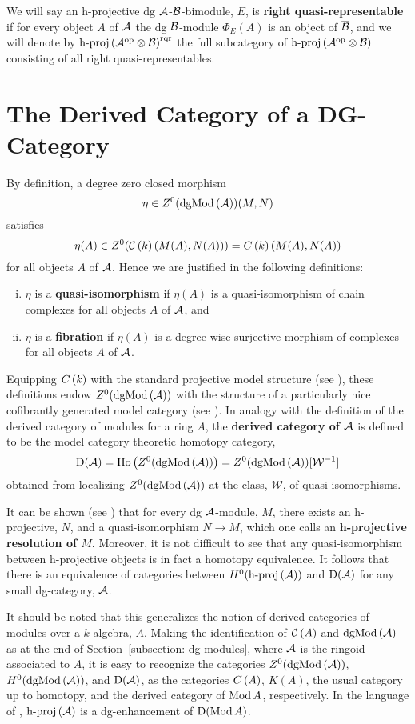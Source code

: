 We will say an h-projective dg \(\mathcal{A}\)-\(\mathcal{B}\)-bimodule, \(E\), is \textbf{right quasi-representable} if for every object \(A\) of \(\mathcal{A}\) the dg \(\mathcal{B}\)-module \(\Phi_E(A)\) is an object of \(\overline{\mathcal{B}}\), and we will denote by \(\operatorname{h-proj}\left(\mathcal{A}^{\operatorname{op}} \otimes \mathcal{B}\right)^{\operatorname{rqr}}\) the full subcategory of \(\operatorname{h-proj}\left(\mathcal{A}^{\operatorname{op}} \otimes \mathcal{B}\right)\) consisting of all right quasi-representables.

\section{The Derived Category of a DG-Category}
By definition, a degree zero closed morphism
\[\eta \in Z^0(\operatorname{dgMod}\left(\mathcal{A}\right))(M,N)\]
satisfies
\[\eta(A) \in Z^0(\mathcal{C}\left(k\right)(M(A), N(A))) = C\left(k\right)(M(A), N(A))\]
for all objects \(A\) of \(\mathcal{A}\).
Hence we are justified in the following definitions:
\begin{enumerate}[(i)]
\item
  \(\eta\) is a \textbf{quasi-isomorphism} if \(\eta(A)\) is a quasi-isomorphism of chain complexes for all objects \(A\) of \(\mathcal{A}\), and
\item
  \(\eta\) is a \textbf{fibration} if \(\eta(A)\) is a degree-wise surjective morphism of complexes for all objects \(A\) of \(\mathcal{A}\).
\end{enumerate}
Equipping \(C\left(k\right)\) with the standard projective model structure (see \parencite[Section 2.3]{Hovey99}), these definitions endow \(Z^0(\operatorname{dgMod}\left(\mathcal{A}\right))\) with the structure of a particularly nice cofibrantly generated model category (see \parencite[Section 3]{Toen07}).
In analogy with the definition of the derived category of modules for a ring \(A\), the \textbf{derived category of \(\mathcal{A}\)} is defined to be the model category theoretic homotopy category,
\[\mathrm{D}(\mathcal{A}) = \operatorname{Ho}\left(Z^0(\operatorname{dgMod}\left(\mathcal{A}\right))\right) = Z^0(\operatorname{dgMod}\left(\mathcal{A}\right))[\mathcal{W}^{-1}]\]
obtained from localizing \(Z^0(\operatorname{dgMod}\left(\mathcal{A}\right))\) at the class, \(\mathcal{W}\), of quasi-isomorphisms.

It can be shown (see \parencite[Section 3.5]{Keller95}) that for every dg \(\mathcal{A}\)-module, \(M\), there exists an h-projective, \(N\), and a quasi-isomorphism \(N \to M\), which one calls an \textbf{h-projective resolution of \(M\)}.
Moreover, it is not difficult to see that any quasi-isomorphism between h-projective objects is in fact a homotopy equivalence.
It follows that there is an equivalence of categories between \(H^0(\operatorname{h-proj}\left(\mathcal{A}\right))\) and \(\mathrm{D}(\mathcal{A})\) for any small dg-category, \(\mathcal{A}\).

It should be noted that this generalizes the notion of derived categories of modules over a $k$-algebra, $A$.
Making the identification of $\mathcal{C}\left(A\right)$ and $\operatorname{dgMod}\left(\mathcal{A}\right)$ as at the end of Section~\ref{subsection: dg modules}, where $\mathcal{A}$ is the ringoid associated to $A$, it is easy to recognize the categories \(Z^0(\operatorname{dgMod}\left(\mathcal{A}\right))\), \(H^0(\operatorname{dgMod}\left(\mathcal{A}\right))\), and \(\mathrm{D}(\mathcal{A})\), as the categories \(C\left(A\right)\), \(K(A)\), the usual category up to homotopy, and the derived category of \(\operatorname{Mod}A\), respectively.
In the language of \parencite{Lunts-Orlov}, \(\operatorname{h-proj}\left(\mathcal{A}\right)\) is a dg-enhancement of \(\mathrm{D}(\operatorname{Mod}A)\).


